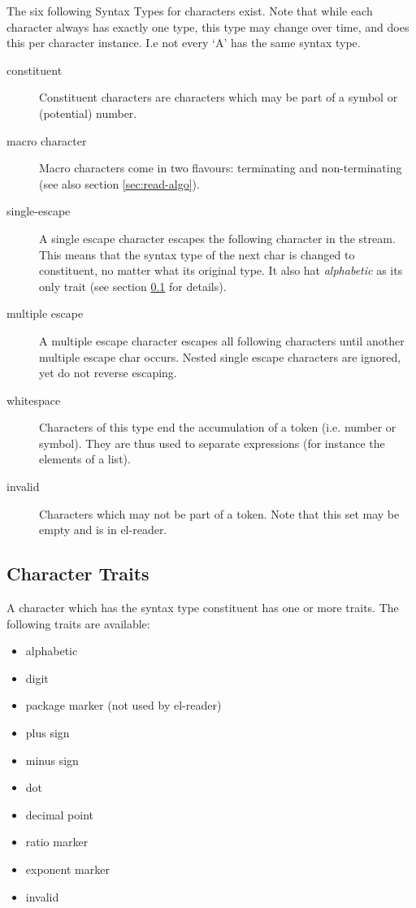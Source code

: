 \documentclass[a4paper,10pt,twoside]{report}
\newcommand{\elr}{el-reader}
\begin{document}
The six following Syntax Types for characters exist.  Note that while each
character always has exactly one type, this type may change over time, and does
this per character instance.  I.e not every `A' has the same syntax type.

\begin{description}
\item[constituent] Constituent characters are characters which may be part of a
  symbol or (potential) number.
\item[macro character] Macro characters come in two flavours: terminating and
  non-terminating (see also section \ref{sec:read-algo}).
\item[single-escape] A single escape character escapes the following character
  in the stream.  This means that the syntax type of the next char is changed to
  constituent, no matter what its original type.  It also hat \emph{alphabetic}
  as its only trait (see section \ref{subsubsec:traits} for details).
\item[multiple escape] A multiple escape character escapes all following
  characters until another multiple escape char occurs.  Nested single escape
  characters are ignored, yet do not reverse escaping.
\item[whitespace] Characters of this type end the accumulation of a token
  (i.e. number or symbol).  They are thus used to separate expressions (for
  instance the elements of a list).
\item[invalid] Characters which may not be part of a token.  Note that this set
  may be empty and is in \elr{}.
\end{description}

\subsection{Character Traits}
\label{subsubsec:traits}

A character which has the syntax type constituent has one or more traits.
The following traits are available:

\begin{itemize}
\item alphabetic
\item digit
\item package marker (not used by \elr{})
\item plus sign
\item minus sign
\item dot
\item decimal point
\item ratio marker
\item exponent marker
\item invalid
\end{itemize}
\end{document}

